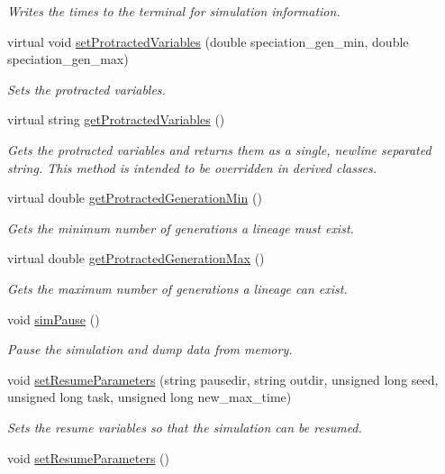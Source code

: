 \begin{DoxyCompactItemize}
\begin{DoxyCompactList}\small\item\em Writes the times to the terminal for simulation information. \end{DoxyCompactList}\item 
virtual void \hyperlink{class_tree_a891764ffc1e29d3edbe0fd08e67a184b}{set\+Protracted\+Variables} (double speciation\+\_\+gen\+\_\+min, double speciation\+\_\+gen\+\_\+max)
\begin{DoxyCompactList}\small\item\em Sets the protracted variables. \end{DoxyCompactList}\item 
virtual string \hyperlink{class_tree_a34c0808026bf00546c8f9786376be730}{get\+Protracted\+Variables} ()
\begin{DoxyCompactList}\small\item\em Gets the protracted variables and returns them as a single, newline separated string. This method is intended to be overridden in derived classes. \end{DoxyCompactList}\item 
virtual double \hyperlink{class_tree_a6ffc42e941f352cd74f01f6f7011f00b}{get\+Protracted\+Generation\+Min} ()
\begin{DoxyCompactList}\small\item\em Gets the minimum number of generations a lineage must exist. \end{DoxyCompactList}\item 
virtual double \hyperlink{class_tree_a0c5e746982a87f24c083f4534bf92b45}{get\+Protracted\+Generation\+Max} ()
\begin{DoxyCompactList}\small\item\em Gets the maximum number of generations a lineage can exist. \end{DoxyCompactList}\item 
void \hyperlink{class_tree_ae5308f74e982485ac444aa394b952152}{sim\+Pause} ()\hypertarget{class_tree_ae5308f74e982485ac444aa394b952152}{}\label{class_tree_ae5308f74e982485ac444aa394b952152}

\begin{DoxyCompactList}\small\item\em Pause the simulation and dump data from memory. \end{DoxyCompactList}\item 
void \hyperlink{class_tree_ac545d844141db977920fc9fd76ce9dbb}{set\+Resume\+Parameters} (string pausedir, string outdir, unsigned long seed, unsigned long task, unsigned long new\+\_\+max\+\_\+time)
\begin{DoxyCompactList}\small\item\em Sets the resume variables so that the simulation can be resumed. \end{DoxyCompactList}\item 
void \hyperlink{class_tree_aeade4bccb8394937a53bc4fbcf2b4300}{set\+Resume\+Parameters} ()\hypertarget{class_tree_aeade4bccb8394937a53bc4fbcf2b4300}{}\label{class_tree_aeade4bccb8394937a53bc4fbcf2b4300}


\end{DoxyCompactItemize}
